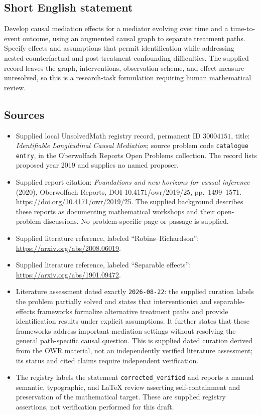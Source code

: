 \documentclass[11pt]{article}
\begin{document}
\subsection{Short English statement}
Develop causal mediation effects for a mediator evolving over time and a time-to-event outcome, using an augmented causal graph to separate treatment paths. Specify effects and assumptions that permit identification while addressing nested-counterfactual and post-treatment-confounding difficulties. The supplied record leaves the graph, interventions, observation scheme, and effect measure unresolved, so this is a research-task formulation requiring human mathematical review.
\subsection{Sources}
\begin{itemize}
\item Supplied local UnsolvedMath registry record, permanent ID \(30004151\), title: \emph{Identifiable Longitudinal Causal Mediation}; source problem code \texttt{catalogue entry}, in the Oberwolfach Reports Open Problems collection. The record lists proposed year 2019 and supplies no named proposer.
\item Supplied report citation: \emph{Foundations and new horizons for causal inference} (2020), Oberwolfach Reports, DOI 10.4171/owr/2019/25, pp.~1499--1571. \url{https://doi.org/10.4171/owr/2019/25}. The supplied background describes these reports as documenting mathematical workshops and their open-problem discussions. No problem-specific page or passage is supplied.
\item Supplied literature reference, labeled ``Robins--Richardson'': \url{https://arxiv.org/abs/2008.06019}.
\item Supplied literature reference, labeled ``Separable effects'': \url{https://arxiv.org/abs/1901.09472}.
\item Literature assessment dated exactly \texttt{2026-08-22}: the supplied curation labels the problem partially solved and states that interventionist and separable-effects frameworks formalize alternative treatment paths and provide identification results under explicit assumptions. It further states that these frameworks address important mediation settings without resolving the general path-specific causal question. This is supplied dated curation derived from the OWR material, not an independently verified literature assessment; its status and cited claims require independent verification.
\item The registry labels the statement \texttt{corrected\_verified} and reports a manual semantic, typographic, and LaTeX review asserting self-containment and preservation of the mathematical target. These are supplied registry assertions, not verification performed for this draft.
\end{itemize}
\end{document}

